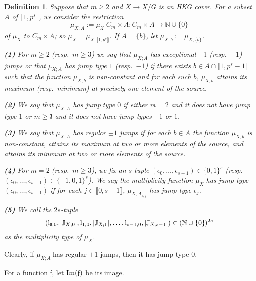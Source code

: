 \documentclass[11pt]{amsart}
\newtheorem{definition}[theorem]{Definition}
\def\Im{\textup{Im}}
\def\l{\textup{l}}
\begin{document}
\begin{definition}\label{D6} Suppose that $m\ge 2$ and $X\rightarrow X/G$ is an HKG cover. For a subset $A$ of $\llbracket1,p^s\rrbracket$, we consider the restriction
$$\mu_{X;A}:=\mu_X|C_m\times A:C_m\times A\rightarrow\mathbb N\cup\{0\}$$
of $\mu_X$ to $C_m\times A$; so $\mu_X=\mu_{X;\llbracket1,p^s\rrbracket}$. If $A=\{b\}$, let $\mu_{X;b}:=\mu_{X,\{b\}}$.

\medskip
{\bf (1)} For $m\ge 2$ (resp.\ $m\ge 3$) we say that $\mu_{X;A}$ has exceptional $+1$ (resp.\ $-1$) jumps or that $\mu_{X;A}$ has jump type $1$ (resp.\ $-1$) if there exists $b\in A\cap\llbracket 1,p^s-1\rrbracket$ such that the function $\mu_{X;b}$ is non-constant and for each such $b$, $\mu_{X;b}$ attains its maximum (resp.\ minimum) at precisely one element of the source.

\smallskip
{\bf (2)} We say that $\mu_{X;A}$ has jump type $0$ if either $m=2$ and it does not have jump type $ 1$ or $m\ge 3$ and it does not have jump types $-1$ or $1$. 

\smallskip
{\bf (3)} We say that $\mu_{X;A}$ has regular $\pm 1$ jumps if for each $b\in A$ the function $\mu_{X;b}$ is non-constant, attains its maximum at two or more elements of the source, and attains its minimum at two or more elements of the source.

\smallskip
{\bf (4)} For $m=2$ (resp.\ $m\ge 3$), we fix an $s$-tuple $(\epsilon_0,\ldots,\epsilon_{s-1})\in\{0,1\}^s$ (resp. $(\epsilon_0,\ldots,\epsilon_{s-1})\in\{-1,0,1\}^s$). We say the multiplicity function $\mu_X$ has jump type $(\epsilon_0,\ldots,\epsilon_{s-1})$ if for each $j\in\llbracket0,s-1\rrbracket$, $\mu_{X;A_{s,j}}$ has jump type $\epsilon_j$.

\smallskip
{\bf (5)} We call the $2s$-tuple 
$$(\l_{0,0},|\mathbb J_{X;0}|,\l_{1,0},|\mathbb J_{X;1}|,\ldots,\l_{s-1,0},|\mathbb J_{X;s-1}|)\in(\mathbb N\cup\{0\})^{2s} $$
 as the multiplicity type of $\mu_X$. 
\end{definition}

Clearly, if $\mu_{X;A}$ has regular $\pm 1$ jumps, then it has jump type $0$.

For a function $\mathfrak f$, let $\Im(\mathfrak f)$ be its image. 
\end{document}
